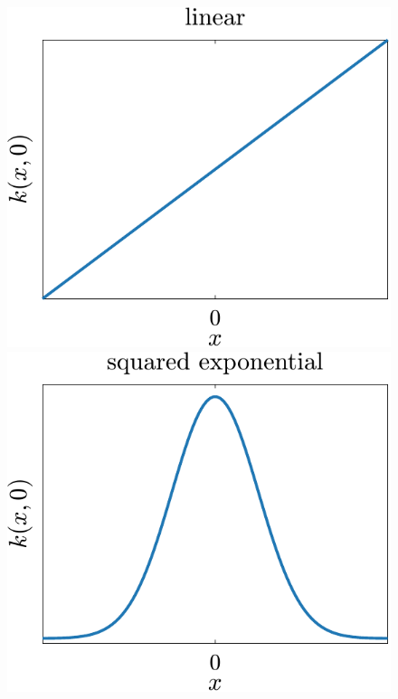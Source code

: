 \begin{figure}[t]
	\centering
	\includegraphics[scale=0.4]{../images/chap2_kernel_li.pdf} \hspace{3pt}
	\includegraphics[scale=0.4]{../images/chap2_kernel_se.pdf} \hspace{3pt}

\end{figure}
